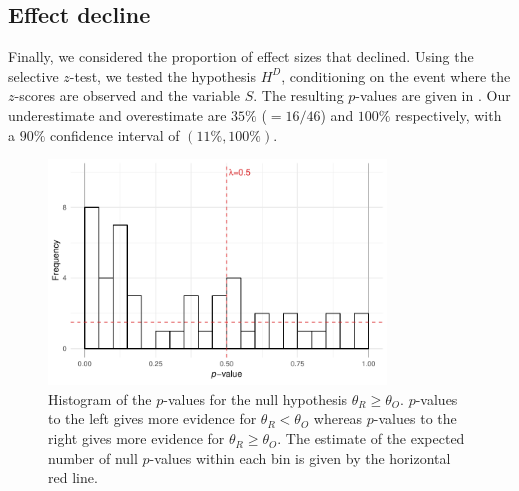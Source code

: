 \documentclass[11pt]{article}
\theoremstyle{definition}
\theoremstyle{custom}
\begin{document}
\subsection{Effect decline}

  Finally, we considered the proportion of effect sizes that declined. Using the selective $z$-test, we tested the hypothesis $H^D$, conditioning on the event where the $z$-scores are observed and the variable $S$. The resulting $p$-values are given in . Our underestimate and overestimate are $35\%$ ($=16/46$) and $100\%$ respectively, with a $90\%$ confidence interval of $(11\%, 100\%)$.
  \begin{figure}[htbp]
    \centering
    \includegraphics[width=0.8\textwidth]{effect-decline}
    \caption{Histogram of the $p$-values for the null hypothesis $\theta_R \ge \theta_O$. $p$-values to the left gives more evidence for $\theta_R < \theta_O$ whereas $p$-values to the right gives more evidence for $\theta_R \ge \theta_O$. The estimate of the expected number of null $p$-values within each bin is given by the horizontal red line.}
  \label{fig:effect-decline}
  \end{figure}
\end{document}
